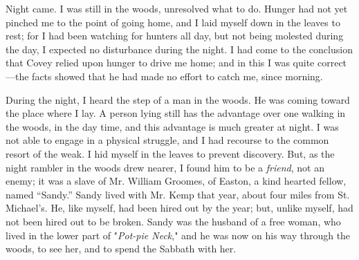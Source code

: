 Night came. I was still in the woods, unresolved what to do. Hunger had
not yet pinched me to the point of going home, and I laid myself down in
the leaves to rest; for I had been watching for hunters all day, but not
being molested during the day, I expected no disturbance during the
night. I had come to the conclusion that Covey relied upon hunger to
drive me home; and in this I was quite correct---the
{\protect\hypertarget{236}{}{}}facts showed that he had made no effort
to catch me, since morning.

During the night, I heard the step of a man in the woods. He was coming
toward the place where I lay. A person lying still has the advantage
over one walking in the woods, in the day time, and this advantage is
much greater at night. I was not able to engage in a physical struggle,
and I had recourse to the common resort of the weak. I hid myself in the
leaves to prevent discovery. But, as the night rambler in the woods drew
nearer, I found him to be a \emph{friend}, not an enemy; it was a slave
of Mr. William Groomes, of Easton, a kind hearted fellow, named
``Sandy.'' Sandy lived with Mr. Kemp that year, about four miles from
St. Michael's. He, like myself, had been hired out by the year; but,
unlike myself, had not been hired out to be broken. Sandy was the
husband of a free woman, who lived in the lower part of "\emph{Pot-pie
Neck}," and he was now on his way through the woods, to see her, and to
spend the Sabbath with her.

